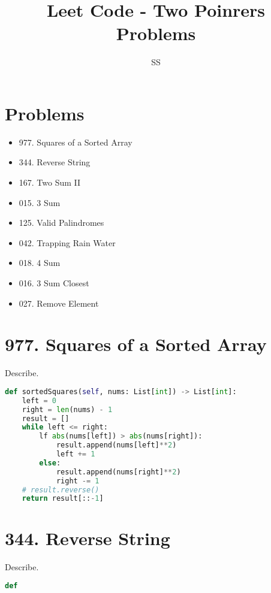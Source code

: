 \documentclass{article}
\title{Leet Code - Two Poinrers Problems}
\author{SS}
\begin{document}
\maketitle

\section{Problems}
\begin{itemize}
    \item 977. Squares of a Sorted Array
    \item 344. Reverse String
    \item 167. Two Sum II
    \item 015. 3 Sum
    \item 125. Valid Palindromes
    \item 042. Trapping Rain Water
    \item 018. 4 Sum
    \item 016. 3 Sum Closest
    \item 027. Remove Element
\end{itemize}
\section{977. Squares of a Sorted Array}
\begin{tcolorbox}[colback=red!5!white, colframe=red!50!black,title=977. Squares of a Sorted Array ] 
Describe.
\end{tcolorbox}
\begin{lstlisting}[language=Python]
def sortedSquares(self, nums: List[int]) -> List[int]:
    left = 0
    right = len(nums) - 1
    result = []
    while left <= right:
        lf abs(nums[left]) > abs(nums[right]):
            result.append(nums[left]**2)
            left += 1
        else:
            result.append(nums[right]**2)
            right -= 1
    # result.reverse()
    return result[::-1]

\end{lstlisting}
\section{344. Reverse String}
\begin{tcolorbox}[colback=red!5!white, colframe=red!50!black,title=344. Reverse String ] 
Describe.
\end{tcolorbox}
\begin{lstlisting}[language=Python]
def 
                

\end{lstlisting}
\end{document}
